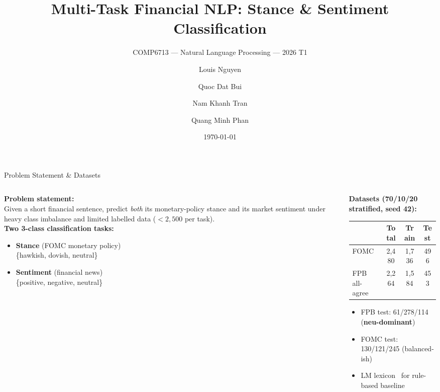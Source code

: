 \documentclass[10pt, aspectratio=169]{beamer}
\title{Multi-Task Financial NLP: Stance \& Sentiment Classification}
\subtitle{COMP6713 --- Natural Language Processing --- 2026 T1}
\author{Louis Nguyen \and Quoc Dat Bui \and Nam Khanh Tran \and Quang Minh Phan}
\institute{UNSW School of Computer Science and Engineering}
\date{\today}
\begin{document}
\begin{frame}
    \titlepage
\end{frame}

\begin{frame}{Problem Statement \& Datasets}
    \begin{columns}[T]
        \begin{column}{0.5\textwidth}
            \textbf{Problem statement:}\\[0.3em]
            Given a short financial sentence, predict \emph{both} its monetary-policy stance and its market sentiment under heavy class imbalance and limited labelled data ($<\!2{,}500$ per task).\\[0.6em]
            \textbf{Two 3-class classification tasks:}
            \begin{itemize}\setlength{\itemsep}{2pt}
                \item \textbf{Stance} (FOMC monetary policy)\\ \{hawkish, dovish, neutral\}
                \item \textbf{Sentiment} (financial news)\\ \{positive, negative, neutral\}
            \end{itemize}
        \end{column}
        \begin{column}{0.5\textwidth}
            \textbf{Datasets (70/10/20 stratified, seed 42):}\\[0.4em]
            {\footnotesize
            \begin{tabular}{lccc}
                \toprule
                & Total & Train & Test \\
                \midrule
                FOMC~\cite{shah2023trillion}       & 2{,}480 & 1{,}736 & 496 \\
                FPB all-agree~\cite{malo2014good}  & 2{,}264 & 1{,}584 & 453 \\
                \bottomrule
            \end{tabular}}
            \vspace{0.5em}
            \begin{itemize}\setlength{\itemsep}{2pt}
                \item FPB test: 61/278/114 (\textbf{neu-dominant})
                \item FOMC test: 130/121/245 (balanced-ish)
                \item LM lexicon~\cite{loughran2011liability} for rule-based baseline
            \end{itemize}
        \end{column}
    \end{columns}
\end{frame}
\end{document}
